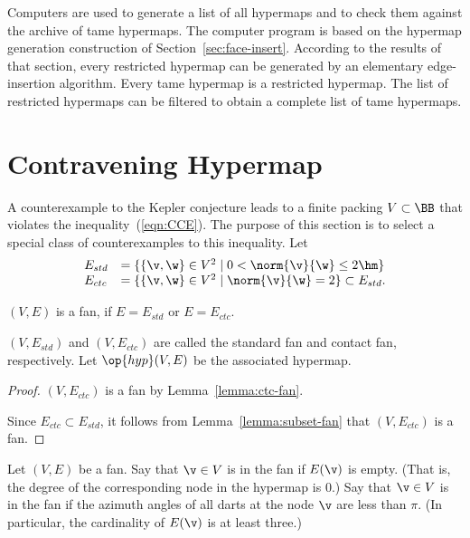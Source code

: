 Computers are used to generate a list of all hypermaps and to check
them against the archive of tame hypermaps.  The computer program is
based on the hypermap generation construction of
Section~\ref{sec:face-insert}.  According to the results of that
section, every restricted hypermap can be generated by an elementary
edge-insertion algorithm.  Every tame hypermap is a restricted
hypermap.  The list of restricted hypermaps can be filtered to obtain
a complete list of tame hypermaps.  %

\section{Contravening Hypermap}

%
A counterexample to the Kepler conjecture leads to a finite packing
$V\subset \BB$ that violates the inequality~(\ref{eqn:CCE}).  The
purpose of this section is to select a special class of
counterexamples to this inequality.  Let
\begin{equation}\label{eqn:fan-edge}
\begin{array}{lll}
E_{std} &= \{\{\v,\w\}\in V^2\mid 0 < \norm{\v}{\w}\le 2\hm \}\\
E_{ctc} &= \{\{\v,\w\}\in V^2\mid \norm{\v}{\w}= 2 \}\subset E_{std}.
\end{array}
\end{equation}

\begin{lemma}
$(V,E)$ is a fan, if $E=E_{std}$ or $E=E_{ctc}$.
\end{lemma}
$(V,E_{std})$ and $(V,E_{ctc})$ are called the standard fan and
contact fan, respectively.  Let $\op{hyp}(V,E)$ be the associated
hypermap.  %
%
%
%
%
%
%

\begin{proof} 
$(V,E_{ctc})$ is a fan by Lemma~\ref{lemma:ctc-fan}.

Since $E_{ctc}\subset E_{std}$, it follows from
Lemma~\ref{lemma:subset-fan} that $(V,E_{ctc})$ is a fan.
\end{proof}

\begin{definition}
  Let $(V,E)$ be a fan.  Say that $\v\in V$ is  in
  the fan if $E(\v)$ is empty.  (That is, the degree of the
  corresponding node in the hypermap is $0$.) Say that $\v\in V$ is
   in the fan if the azimuth angles of all darts
  at the node $\v$ are less than $\pi$.  (In particular, the
  cardinality of $E(\v)$ is at least three.)
\end{definition}
%
%
%
%
%
%

